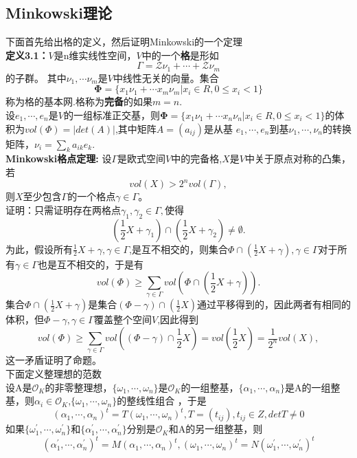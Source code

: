 \documentclass[UTF8]{article}
\begin{document}
    \subsection{Minkowski理论}
    下面首先给出格的定义，然后证明Minkowski的一个定理\\
    \textbf{定义3.1：}$V$是n维实线性空间，$V$中的一个\textbf{格}是形如
    $$\Gamma=\mathcal{Z}\nu_{1}+\cdots +\mathcal{Z}\nu_{m}$$的子群。
    其中$\nu_{1},\cdots \nu_{m}$是$V$中线性无关的向量。集合$$
    \boldsymbol{\Phi}=\{x_{1}\nu_{1}+\cdots x_{m}\nu_{m}|x_{i}\in R,0\leq x_{i}<1\}
    $$
    称为格的基本网.格称为\textbf{完备}的如果$m=n.$\\
    设$e_{1},\cdots ,e_{n}$是$V$的一组标准正交基，则$ \boldsymbol{\Phi}=\{x_{1}\nu_{1}+\cdots x_{n}\nu_{n}|x_{i}\in R,0\leq x_{i}<1\}$的体积为$vol(\Phi)=|det(A)|$,其中矩阵$A=(a_{ij})$是从基
    $e_{1},\cdots ,e_{n}$到基$\nu_{1},\cdots ,\nu_{n}$的转换矩阵，$\nu_{i}=\sum_{k}a_{ik}e_{k}.$\\
    \textbf{Minkowski格点定理:} 设$\Gamma$是欧式空间$V$中的完备格,$X$是$V$中关于原点对称的凸集，若$$vol(X)>2^{n}vol(\Gamma),$$则$X$至少包含$\Gamma$的一个格点$\gamma \in \Gamma$。\\
    证明：只需证明存在两格点$\gamma_{1},\gamma_{2}\in \Gamma,$使得$$
    (\frac{1}{2}X+\gamma_{1})\cap (\frac{1}{2}X+\gamma_{2})\neq \emptyset.
    $$
    为此，假设所有$\frac{1}{2}X+\gamma,\gamma \in \Gamma$,是互不相交的，则集合$\Phi\cap (\frac{1}{2}X+\gamma),\gamma \in \Gamma $对于所有$\gamma \in \Gamma $也是互不相交的，于是有$$
    vol(\Phi)\geq \sum_{\gamma \in \Gamma}vol(\Phi\cap (\frac{1}{2}X+\gamma)).
    $$
    集合$\Phi\cap (\frac{1}{2}X+\gamma)$是集合$(\Phi-\gamma)\cap (\frac{1}{2}X)$通过平移得到的，因此两者有相同的体积，但$\Phi-\gamma,\gamma \in \Gamma$覆盖整个空间$V$,因此得到$$
    vol(\Phi)\geq \sum_{\gamma \in \Gamma}vol((\Phi-\gamma)\cap \frac{1}{2}X)=vol(\frac{1}{2}X)=\frac{1}{2^{n}}vol(X),
    $$这一矛盾证明了命题。\\
    下面定义整理想的范数\\
     设A是$\mathcal{O}_{K}$的非零整理想，$\{\omega_{1},\cdots ,\omega_{n}\}$是$\mathcal{O}_{K}$的一组整基，$\{\alpha_{1},\cdots,\alpha_{n}\}$是A的一组整基，则$\alpha_{i}\in \mathcal{O}_{K}$,$\{\omega_{1},\cdots ,\omega_{n}\}$的整线性组合
     ，于是$$
     (\alpha_{1},\cdots,\alpha_{n})^{t}=T(\omega_{1},\cdots ,\omega_{n})^{t},T=(t_{ij}),t_{ij}\in Z,detT\neq 0
     $$
     如果$\{\omega_{1}^{'},\cdots ,\omega_{n}^{'}\}$和$\{\alpha_{1}^{'},\cdots,\alpha_{n}^{'}\}$分别是$\mathcal{O}_{K}$和A的另一组整基，则$$
     (\alpha_{1}^{'},\cdots,\alpha_{n}^{'})^{t}=M(\alpha_{1},\cdots,\alpha_{n})^{t},
     (\omega_{1},\cdots ,\omega_{n})^{t}=N(\omega_{1}^{'},\cdots ,\omega_{n}^{'})^{t}
     $$
\end{document}
